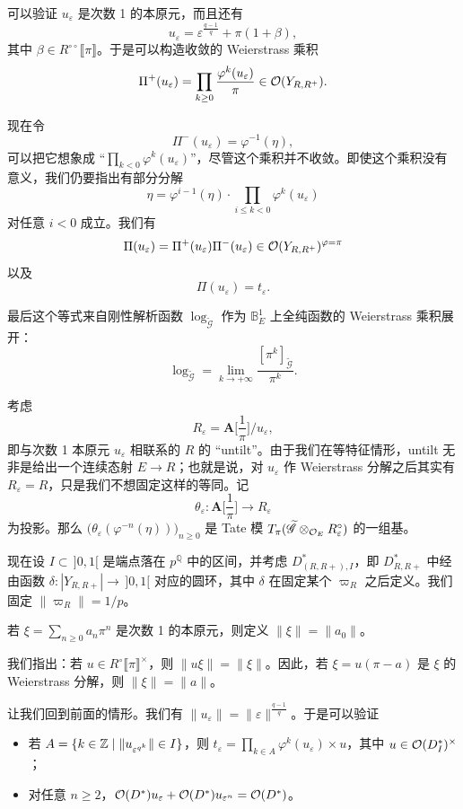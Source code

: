 可以验证 $u_\varepsilon$ 是次数 1 的本原元，而且还有
\[
u_\varepsilon=\varepsilon^{\frac{q-1}{q}}+\pi(1+\beta),
\]
其中 $\beta\in R^{\circ\circ}\llbracket\pi\rrbracket$。于是可以构造收敛的 Weierstrass 乘积
\[
\Pi^+(u_\varepsilon)=\prod_{k\ge 0}\frac{\varphi^k(u_\varepsilon)}{\pi}\in\mathcal{O}(Y_{R,R^+}).
\]

现在令
\[
\Pi^-(u_\varepsilon)=\varphi^{-1}(\eta),
\]
可以把它想象成 “$\prod_{k<0}\varphi^k(u_\varepsilon)$”，尽管这个乘积并不收敛。即使这个乘积没有意义，我们仍要指出有部分分解
\[
\eta=\varphi^{i-1}(\eta)\cdot\prod_{i\le k<0}\varphi^k(u_\varepsilon)
\]
对任意 $i<0$ 成立。我们有
\[
\Pi(u_\varepsilon)=\Pi^+(u_\varepsilon)\Pi^-(u_\varepsilon)\in\mathcal{O}(Y_{R,R^+})^{\varphi=\pi}
\]
以及
\[
\Pi(u_\varepsilon)=t_\varepsilon .
\]

最后这个等式来自刚性解析函数 $\log_{\widetilde{\mathscr{G}}}$ 作为 $\mathbb{B}^1_E$ 上全纯函数的 Weierstrass 乘积展开：
\[
\log_{\widetilde{\mathscr{G}}}=\lim_{k\to+\infty}\frac{[\pi^k]_{\widetilde{\mathscr{G}}}}{\pi^k}.
\]

考虑
\[
R_\varepsilon=\mathbf{A}\Big[\frac{1}{\pi}\Big]\Big/u_\varepsilon ,
\]
即与次数 1 本原元 $u_\varepsilon$ 相联系的 $R$ 的 “untilt”。由于我们在等特征情形，untilt 无非是给出一个连续态射 $E\to R$；也就是说，对 $u_\varepsilon$ 作 Weierstrass 分解之后其实有 $R_\varepsilon=R$，只是我们不想固定这样的等同。记
\[
\theta_\varepsilon:\mathbf{A}\Big[\frac{1}{\pi}\Big]\longrightarrow R_\varepsilon
\]
为投影。那么 $\big(\theta_\varepsilon(\varphi^{-n}(\eta))\big)_{n\ge0}$ 是 Tate 模 $T_\pi(\widetilde{\mathscr{G}}\otimes_{\mathcal{O}_E}R_\varepsilon^\circ)$ 的一组基。

现在设 $I\subset\,]0,1[$ 是端点落在 $p^{\mathbb{Q}}$ 中的区间，并考虑 $D^*_{(R,R+),I}$，即 $D^*_{R,R+}$ 中经由函数 $\delta:|Y_{R,R+}|\to\,]0,1[$ 对应的圆环，其中 $\delta$ 在固定某个 $\varpi_R$ 之后定义。我们固定 $\|\varpi_R\|=1/p$。

\begin{definition}\label{def:1.25}
若 $\xi=\sum_{n\ge0}a_n\pi^n$ 是次数 1 的本原元，则定义 $\|\xi\|=\|a_0\|$。
\end{definition}

我们指出：若 $u\in R^\circ\llbracket\pi\rrbracket^\times$，则 $\|u\xi\|=\|\xi\|$。因此，若 $\xi=u(\pi-a)$ 是 $\xi$ 的 Weierstrass 分解，则 $\|\xi\|=\|a\|$。

让我们回到前面的情形。我们有 $\|u_\varepsilon\|=\|\varepsilon\|^{\frac{q-1}{q}}$。于是可以验证
\begin{itemize}[leftmargin=2em]
\item 若 $A=\{k\in\mathbb{Z}\mid \|u_{\varepsilon^{q^k}}\|\in I\}$，则 $t_\varepsilon=\prod_{k\in A}\varphi^k(u_\varepsilon)\times u$，其中 $u\in\mathcal{O}(D^*_I)^\times$；
\item 对任意 $n\ge2$，$\mathcal{O}(D^*)u_\varepsilon+\mathcal{O}(D^*)u_{\varepsilon^n}=\mathcal{O}(D^*)$。
\end{itemize}

